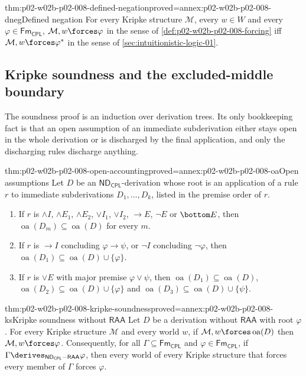 \begin{hblemma}{thm:p02-w02b-p02-008-defined-negation}{proved=annex:p02-w02b-p02-008-dneg}{Defined negation}
For every Kripke structure \(\mathcal M\), every \(w\in W\) and every
\(\varphi\in\mathsf{Fm}_{\mathsf{CPL}}\), \(\mathcal M,w\forces\varphi\) in
the sense of \cref{def:p02-w02b-p02-008-forcing} iff
\(\mathcal M,w\forces\varphi^{\ast}\) in the sense of
\cref{sec:intuitionistic-logic-01}.
\end{hblemma}

\subsection{Kripke soundness and the excluded-middle boundary}
\label{sec:p02-w02b-p02-008-soundness}

The soundness proof is an induction over derivation trees.  Its only
bookkeeping fact is that an open assumption of an immediate subderivation
either stays open in the whole derivation or is discharged by the final
application, and only the discharging rules discharge anything.

\begin{hblemma}{thm:p02-w02b-p02-008-open-accounting}{proved=annex:p02-w02b-p02-008-oa}{Open assumptions}
Let \(D\) be an \(\mathsf{ND}_{\mathsf{CPL}}\)-derivation whose root is an
application of a rule \(r\) to immediate subderivations
\(D_1,\ldots,D_k\), listed in the premise order of \(r\).
\begin{enumerate}
  \item If \(r\) is \(\land I\), \(\land E_1\), \(\land E_2\), \(\lor I_1\),
        \(\lor I_2\), \(\to E\), \(\neg E\) or \(\bottom E\), then
        \(\operatorname{oa}(D_m)\subseteq\operatorname{oa}(D)\) for every
        \(m\).
  \item If \(r\) is \(\to I\) concluding \(\varphi\to\psi\), or \(\neg I\)
        concluding \(\neg\varphi\), then
        \(\operatorname{oa}(D_1)\subseteq\operatorname{oa}(D)\cup\{\varphi\}\).
  \item If \(r\) is \(\lor E\) with major premise \(\varphi\lor\psi\), then
        \(\operatorname{oa}(D_1)\subseteq\operatorname{oa}(D)\),
        \(\operatorname{oa}(D_2)\subseteq\operatorname{oa}(D)\cup\{\varphi\}\)
        and
        \(\operatorname{oa}(D_3)\subseteq\operatorname{oa}(D)\cup\{\psi\}\).
\end{enumerate}
\end{hblemma}

\begin{hbtheorem}{thm:p02-w02b-p02-008-kripke-soundness}{proved=annex:p02-w02b-p02-008-ks}{Kripke soundness without \(\mathsf{RAA}\)}
Let \(D\) be a derivation without \(\mathsf{RAA}\) with root \(\varphi\).
For every Kripke structure \(\mathcal M\) and every world \(w\), if
\(\mathcal M,w\forces\operatorname{oa}(D)\) then
\(\mathcal M,w\forces\varphi\).  Consequently, for all
\(\Gamma\subseteq\mathsf{Fm}_{\mathsf{CPL}}\) and
\(\varphi\in\mathsf{Fm}_{\mathsf{CPL}}\), if
\(\Gamma\derives_{\mathsf{ND}_{\mathsf{CPL}}-\mathsf{RAA}}\varphi\), then
every world of every Kripke structure that forces every member of \(\Gamma\)
forces \(\varphi\).
\end{hbtheorem}

